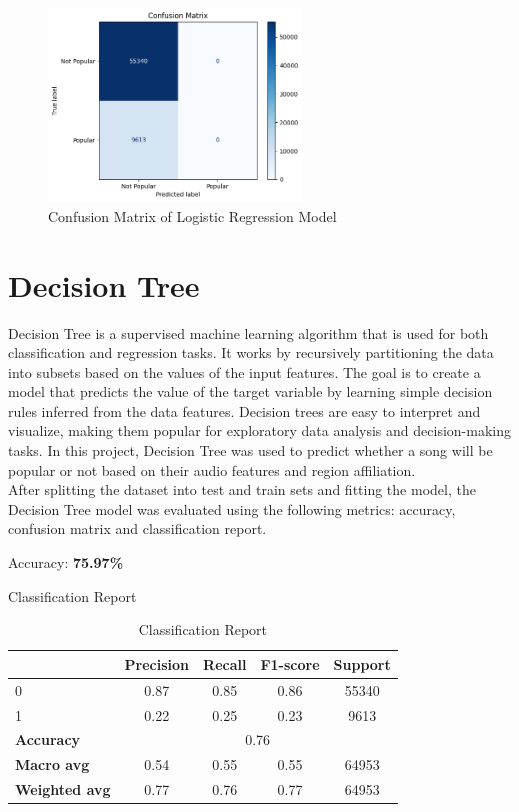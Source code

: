 \begin{figure}[h] 
    \centering 
    \includegraphics[width=0.6\textwidth]{media/log_reg_confusionmatrix.png}
    \caption{Confusion Matrix of Logistic Regression Model}

\end{figure}



\newpage

\section{Decision Tree}

Decision Tree is a supervised machine learning algorithm that is used for both classification and regression tasks. It works by recursively partitioning the data into subsets based on the values of the input features. The goal is to create a model that predicts the value of the target variable by learning simple decision rules inferred from the data features. Decision trees are easy to interpret and visualize, making them popular for exploratory data analysis and decision-making tasks. In this project, Decision Tree was used to predict whether a song will be popular or not based on their audio features and region affiliation. \\

After splitting the dataset into test and train sets and fitting the model, the Decision Tree model was evaluated using the following metrics: accuracy, confusion matrix and classification report.


Accuracy: \textbf{75.97\%}

Classification Report
\begin{table}[h]
    \centering
    \begin{tabular}{lcccc}
        \toprule
        & \textbf{Precision} & \textbf{Recall} & \textbf{F1-score} & \textbf{Support} \\
        \midrule
        0 & 0.87 & 0.85 & 0.86 & 55340 \\
        1 & 0.22 & 0.25 & 0.23 & 9613 \\
        \midrule
        \textbf{Accuracy} & \multicolumn{4}{c}{0.76} \\
        \textbf{Macro avg} & 0.54 & 0.55 & 0.55 & 64953 \\
        \textbf{Weighted avg} & 0.77 & 0.76 & 0.77 & 64953 \\
        \bottomrule
    \end{tabular}
    \caption{Classification Report}
    \label{tab:classification_report}
\end{table}
 
